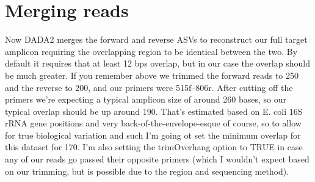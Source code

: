 \documentclass[
]{book}
\newenvironment{Shaded}{\begin{snugshade}}{\end{snugshade}}
\newcommand{\AttributeTok}[1]{\textcolor[rgb]{0.77,0.63,0.00}{#1}}
\newcommand{\CommentTok}[1]{\textcolor[rgb]{0.56,0.35,0.01}{\textit{#1}}}
\newcommand{\ConstantTok}[1]{\textcolor[rgb]{0.00,0.00,0.00}{#1}}
\newcommand{\DecValTok}[1]{\textcolor[rgb]{0.00,0.00,0.81}{#1}}
\newcommand{\FunctionTok}[1]{\textcolor[rgb]{0.00,0.00,0.00}{#1}}
\newcommand{\NormalTok}[1]{#1}
\newcommand{\OtherTok}[1]{\textcolor[rgb]{0.56,0.35,0.01}{#1}}
\newcommand{\SpecialCharTok}[1]{\textcolor[rgb]{0.00,0.00,0.00}{#1}}
\begin{document}
\hypertarget{merging-reads}{%
\section{Merging reads}\label{merging-reads}}

Now DADA2 merges the forward and reverse ASVs to reconstruct our full target amplicon requiring the overlapping region to be identical between the two. By default it requires that at least 12 bps overlap, but in our case the overlap should be much greater. If you remember above we trimmed the forward reads to 250 and the reverse to 200, and our primers were 515f--806r. After cutting off the primers we're expecting a typical amplicon size of around 260 bases, so our typical overlap should be up around 190. That's estimated based on E. coli 16S rRNA gene positions and very back-of-the-envelope-esque of course, so to allow for true biological variation and such I'm going ot set the minimum overlap for this dataset for 170. I'm also setting the trimOverhang option to TRUE in case any of our reads go passed their opposite primers (which I wouldn't expect based on our trimming, but is possible due to the region and sequencing method).

\begin{Shaded}
\end{Shaded}
\end{document}
